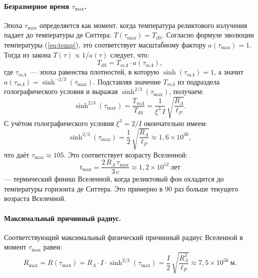 \documentclass[12pt,a4paper]{article}
\begin{document}
\paragraph{Безразмерное время $\tau_{\max}$.}
Эпоха $\tau_{\max}$ определяется как момент, когда температура реликтового излучения падает до температуры де Ситтера: $T(\tau_{\max}) = T_{\mathrm{dS}}$. Согласно формуле эволюции температуры (\ref{eq:temp}), это соответствует масштабному фактору $a(\tau_{\max}) = 1$. Тогда из закона $T(\tau) \propto 1/a(\tau)$ следует, что:
\begin{equation}
T_{\mathrm{dS}} = T_{m\Lambda} \cdot a(\tau_{m\Lambda}),
\end{equation}
где $\tau_{m\Lambda}$~--- эпоха равенства плотностей, в которую $\sinh(\tau_{m\Lambda}) = 1$, а значит $a(\tau_{m\Lambda}) = \sinh^{-2/3}(\tau_{\max})$. Подставляя значение $T_{m\Lambda}$ из подраздела голографического условия и выражая $\sinh^{2/3}(\tau_{\max})$, получаем:
\begin{equation}
\sinh^{2/3}(\tau_{\max}) = \frac{T_{m\Lambda}}{T_{\mathrm{dS}}} = \frac{1}{\xi^3\,I}\,\sqrt{\frac{R_\Lambda}{\ell_P}}.
\end{equation}
С учётом голографического условия $\xi^3 = 2/I$ окончательно имеем:
\begin{equation}
\boxed{\sinh^{2/3}(\tau_{\max}) = \frac{1}{2}\,\sqrt{\frac{R_\Lambda}{\ell_P}} \approx 1{,}6 \times 10^{30},}
\end{equation}
что даёт $\tau_{\max} \approx 105$. Это соответствует возрасту Вселенной:
\begin{equation}
t_{\max} = \frac{2\,R_\Lambda\,\tau_{\max}}{3\,c} \approx 1{,}2 \times 10^{12}~\text{лет}
\end{equation}
--- термический финиш Вселенной, когда реликтовый фон охладится до температуры горизонта де Ситтера. Это примерно в 90 раз больше текущего возраста Вселенной.

\paragraph{Максимальный причинный радиус.}
Соответствующий максимальный физический причинный радиус Вселенной в момент $\tau_{\max}$ равен:
\begin{equation}
\boxed{R_{\max} = R(\tau_{\max}) = R_\Lambda \cdot I \cdot \sinh^{2/3}(\tau_{\max}) = \frac{I}{2}\,\sqrt{\frac{R_\Lambda^3}{\ell_P}} \approx 7{,}5 \times 10^{56}~\text{м}.}
\end{equation}
\end{document}
